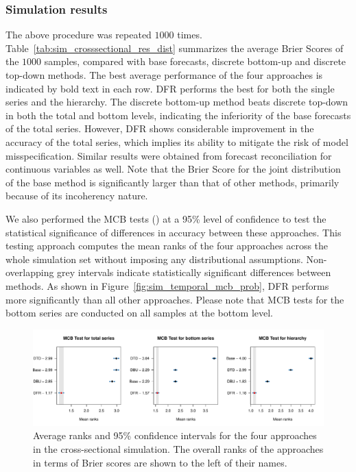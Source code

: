 \documentclass[a4paper,review,12pt,authoryear]{elsarticle}
\begin{document}
    \subsubsection{Simulation results}
    The above procedure was repeated $1000$ times. 
    Table~\ref{tab:sim_crosssectional_res_dist} summarizes the average Brier Scores of the $1000$ samples, compared with base forecasts, discrete bottom-up and discrete top-down methods.
    The best average performance of the four approaches is indicated by bold text in each row.
    DFR performs the best for both the single series and the hierarchy. 
    The discrete bottom-up method beats discrete top-down in both the total and bottom levels, indicating the inferiority of the base forecasts of the total series.
    However, DFR shows considerable improvement in the accuracy of the total series, which implies its ability to mitigate the risk of model misspecification.
    Similar results were obtained from forecast reconciliation for continuous variables as well.
    Note that the Brier Score for the joint distribution of the base method is significantly larger than that of other methods, primarily because of its incoherency nature.
    
    We also performed the MCB tests (\citealp{koningM3CompetitionStatistical2005}) at a 95\% level of confidence to test the statistical significance of differences in accuracy between these approaches. 
    This testing approach computes the mean ranks of the four approaches across the whole simulation set without imposing any distributional assumptions.
    Non-overlapping grey intervals indicate statistically significant differences between methods.
    As shown in Figure~\ref{fig:sim_temporal_mcb_prob}, DFR performs more significantly than all other approaches.
    Please note that MCB tests for the bottom series are conducted on all samples at the bottom level.
  
    \begin{figure}
      \centering
      \label{fig:mcb_crosssectional}
      \caption{Average ranks and 95\% confidence intervals for the four approaches in the cross-sectional simulation. The overall ranks of the approaches in terms of Brier scores are shown to the left of their names.}
      \includegraphics[width=\textwidth]{figures/cross_sectional_mcb.pdf}
    \end{figure}
    
\end{document}
